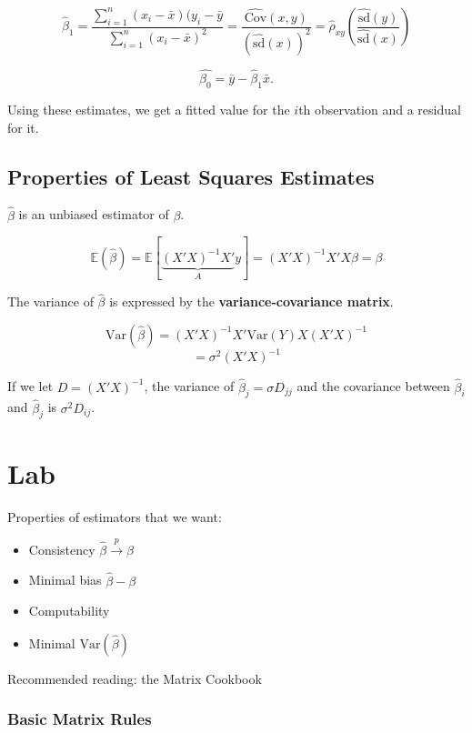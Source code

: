 \documentclass[
  letterpaper,
  DIV=11,
  numbers=noendperiod]{scrreport}
\providecommand{\tightlist}{%
  \setlength{\itemsep}{0pt}\setlength{\parskip}{0pt}}\usepackage{longtable,booktabs,array}
\begin{document}
\[\hat \beta_1 = 
\frac{\sum_{i=1}^n (x_i - \bar x)(y_i - \bar y}{\sum_{i=1}^n (x_i - \bar x)^2} = \frac{\widehat{\text{Cov}} (x,y)}{\left(\widehat{\text{sd}}(x)\right)^2} = 
\hat \rho_{xy} \left( \frac{\widehat{\text{sd}}(y)}{\widehat{\text{sd}}(x)} \right)\]

\[\hat{\beta_0} = \bar y - \hat \beta_1 \bar x.\]

Using these estimates, we get a {fitted value} for the \(i\)th
observation and a residual for it.

\hypertarget{properties-of-least-squares-estimates}{%
\section{Properties of Least Squares
Estimates}\label{properties-of-least-squares-estimates}}

\(\hat \beta\) is an unbiased estimator of \(\beta\).

\[\mathbb E(\hat \beta) = \mathbb E[\underbrace{(X'X)^{-1} X'}_{A} y] = (X'X)^{-1} X'X \beta = \beta\]

The variance of \(\hat \beta\) is expressed by the
\textbf{variance-covariance matrix}.

\[\text{Var}(\hat \beta) = (X'X)^{-1} X' \text{Var}(Y) X (X'X)^{-1}\]
\[ = \sigma^2 (X'X)^{-1}\]

If we let \(D = (X'X)^{-1}\), the variance of
\(\hat \beta_j = \sigma D_{jj}\) and the covariance between
\(\hat \beta_i\) and \(\hat \beta_j\) is \(\sigma^2 D_{ij}\).


\hypertarget{lab}{%
\chapter{Lab}\label{lab}}

Properties of estimators that we want:

\begin{itemize}
\tightlist
\item
  Consistency \(\hat \beta \stackrel{p}{\to} \beta\)
\item
  Minimal bias \(\hat \beta - \beta\)
\item
  Computability
\item
  Minimal \(\text{Var}(\hat \beta)\)
\end{itemize}

Recommended reading: the Matrix Cookbook

\hypertarget{basic-matrix-rules}{%
\subsection{Basic Matrix Rules}\label{basic-matrix-rules}}
\end{document}
